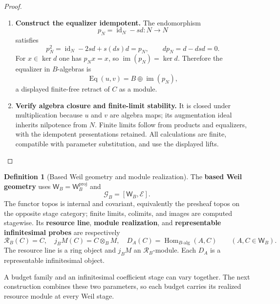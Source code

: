 \documentclass[11pt,a4paper]{article}
\numberwithin{algorithm}{section}
\numberwithin{equation}{section}
\theoremstyle{definition}
\newtheorem{definition}[definition]{Definition}
\theoremstyle{remark}
\theoremstyle{plain}
\newcommand{\E}{\mathcal E}
\newcommand{\id}{\operatorname{id}}
\newcommand{\Hom}{\operatorname{Hom}}
\newcommand{\Weil}{\mathsf W}
\newcommand{\Geo}{\mathcal G_B}
\newcommand{\Rline}{\mathcal R_B}
\theoremstyle{definition}
\theoremstyle{plain}
\begin{document}
\begin{proof}
\begin{enumerate}[leftmargin=*,align=left]
\item \textbf{Construct the equalizer idempotent.}
The endomorphism
\[
 p_N=\id_N-sd:N\longrightarrow N
\]
satisfies
\[
 p_N^2=\id_N-2sd+s(d s)d=p_N,\qquad
 d p_N=d-dsd=0.
\]
For $x\in\ker d$ one has $p_Nx=x$, so
$\operatorname{im}(p_N)=\ker d$. Therefore the equalizer in $B$-algebras is
\[
 \operatorname{Eq}(u,v)=B\oplus\operatorname{im}(p_N),
\]
a displayed finite-free retract of $C$ as a module.

\item \textbf{Verify algebra closure and finite-limit stability.}
It is
closed under multiplication because $u$ and $v$ are algebra
maps; its augmentation ideal inherits nilpotence from $N$.
Finite limits follow from products and equalizers, with the
idempotent presentations retained. All calculations are finite,
compatible with parameter substitution, and use the displayed lifts.
\end{enumerate}
\end{proof}


\begin{definition}[Based Weil geometry and module realization]\label{def:based-weil-geometry}
The \textbf{based Weil geometry} uses
$\Weil_B=\Weil_B^{\mathrm{proj}}$ and
\[
 \Geo=[\Weil_B,\E].
\]
The functor topos is internal and covariant, equivalently the
presheaf topos on the opposite stage category; finite limits,
colimits, and images are computed stagewise.
Its \textbf{resource line}, \textbf{module realization}, and
\textbf{representable infinitesimal probes} are respectively
\[
 \Rline(C)=C,\quad
 j_BM(C)=C\otimes_BM,\quad
 D_A(C)=\Hom_{B\text{-alg}}(A,C)
 \qquad(A,C\in\Weil_B).
\]
The resource line is a ring object and $j_BM$ an $\Rline$-module.
Each $D_A$ is a representable infinitesimal object.
\end{definition}


A budget family and an infinitesimal coefficient stage can vary
together. The next construction combines these two parameters, so
each budget carries its realized resource module at every Weil stage.
\end{document}
